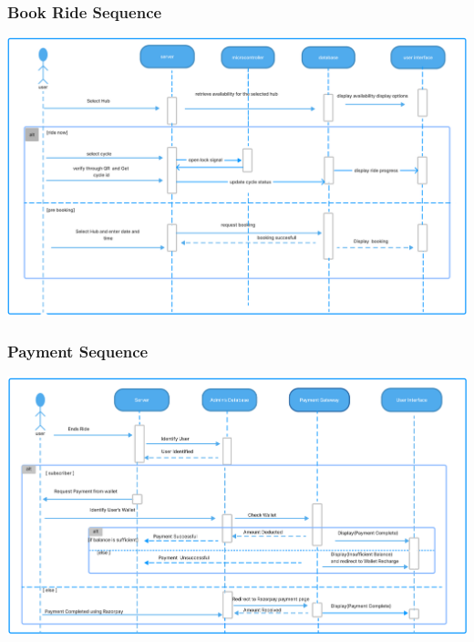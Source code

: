 \documentclass[11pt]{article}
\begin{document}
\subsubsection{Book Ride Sequence}
\begin{center}
  \includegraphics[scale=0.27]{sequence-diagram-images/book.png}
\end{center}

\subsubsection{Payment Sequence}
\begin{center}
  \includegraphics[scale=0.28]{sequence-diagram-images/payment.png}
\end{center}
\end{document}
